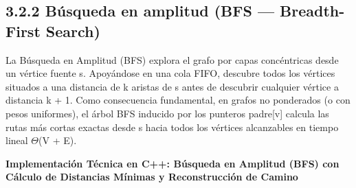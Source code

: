 \documentclass[11pt,letterpaper]{article}
\begin{document}
\subsection*{3.2.2 Búsqueda en amplitud (BFS — Breadth-First Search)}
La Búsqueda en Amplitud (BFS) explora el grafo por capas concéntricas desde un vértice fuente s. Apoyándose en una cola FIFO, descubre todos los vértices situados a una distancia de k aristas de s antes de descubrir cualquier vértice a distancia k + 1. Como consecuencia fundamental, en grafos no ponderados (o con pesos uniformes), el árbol BFS inducido por los punteros padre[v] calcula las rutas más cortas exactas desde s hacia todos los vértices alcanzables en tiempo lineal $\Theta$(V + E).\par
\vspace{4pt}\noindent\textbf{\color{ipnblue}Implementación Técnica en C++: Búsqueda en Amplitud (BFS) con Cálculo de Distancias Mínimas y Reconstrucción de Camino}\par\vspace{-2pt}
\end{document}
